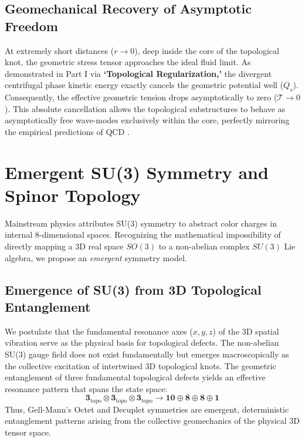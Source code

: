 \documentclass[reprint,amsmath,amssymb,aps,prd]{revtex4-2}
\begin{document}
\subsection{Geomechanical Recovery of Asymptotic Freedom}
At extremely short distances ($r \to 0$), deep inside the core of the topological knot, the geometric stress tensor approaches the ideal fluid limit. As demonstrated in Part I via \textbf{`Topological Regularization,'} the divergent centrifugal phase kinetic energy exactly cancels the geometric potential well ($Q_s$). Consequently, the effective geometric tension drops asymptotically to zero ($\mathcal{T} \to 0$). This absolute cancellation allows the topological substructures to behave as asymptotically free wave-modes exclusively within the core, perfectly mirroring the empirical predictions of QCD \cite{Gross1973}.

\section{Emergent SU(3) Symmetry and Spinor Topology}

Mainstream physics attributes SU(3) symmetry to abstract color charges in internal 8-dimensional spaces. Recognizing the mathematical impossibility of directly mapping a 3D real space $SO(3)$ to a non-abelian complex $SU(3)$ Lie algebra, we propose an \textit{emergent} symmetry model.

\subsection{Emergence of SU(3) from 3D Topological Entanglement}
We postulate that the fundamental resonance axes ($x, y, z$) of the 3D spatial vibration serve as the physical basis for topological defects. The non-abelian SU(3) gauge field does not exist fundamentally but emerges macroscopically as the collective excitation of intertwined 3D topological knots. The geometric entanglement of three fundamental topological defects yields an effective resonance pattern that spans the state space:
\begin{equation}
\mathbf{3}_{\mathrm{topo}} \otimes \mathbf{3}_{\mathrm{topo}} \otimes \mathbf{3}_{\mathrm{topo}} \to \mathbf{10} \oplus \mathbf{8} \oplus \mathbf{8} \oplus \mathbf{1}
\end{equation}
Thus, Gell-Mann's Octet and Decuplet symmetries \cite{GellMann1964} are emergent, deterministic entanglement patterns arising from the collective geomechanics of the physical 3D tensor space.
\end{document}
